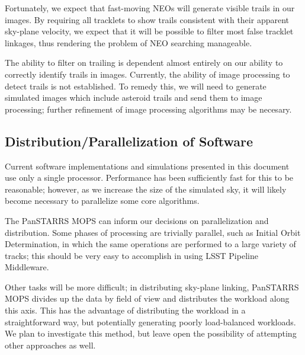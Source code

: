 \documentclass[12pt,preprint]{aastex}
\begin{document}
Fortunately, we expect that fast-moving NEOs will generate visible
trails in our images.  By requiring all tracklets to show trails
consistent with their apparent sky-plane velocity, we expect that it
will be possible to filter most false tracklet linkages, thus
rendering the problem of NEO searching manageable.

The ability to filter on trailing is dependent almost entirely on our
ability to correctly identify trails in images.  Currently, the
ability of image processing to detect trails is not established.  To
remedy this, we will need to generate simulated images which include
asteroid trails and send them to image processing; further refinement
of image processing algorithms may be necesary.



\subsection{Distribution/Parallelization of Software}

Current software implementations and simulations presented in this
document use only a single processor.  Performance has been
sufficiently fast for this to be reasonable; however, as we increase
the size of the simulated sky, it will likely become necessary to
parallelize some core algorithms.

The PanSTARRS MOPS can inform our decisions on parallelization and
distribution.  Some phases of processing are trivially parallel, such
as Initial Orbit Determination, in which the same operations are
performed to a large variety of tracks; this should be very easy to
accomplish in using LSST Pipeline Middleware.  

Other tasks will be more difficult; in distributing sky-plane linking,
PanSTARRS MOPS divides up the data by field of view and distributes
the workload along this axis.  This has the advantage of distributing
the workload in a straightforward way, but potentially generating
poorly load-balanced workloads.  We plan to investigate this method,
but leave open the possibility of attempting other approaches as well.




\end{document}
